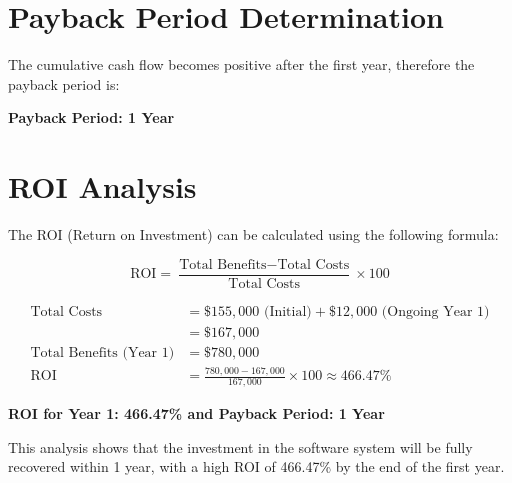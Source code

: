 \documentclass{article}
\begin{document}
\section*{Payback Period Determination}

The cumulative cash flow becomes positive after the first year, therefore the payback period is:

\textbf{Payback Period: 1 Year}

\section*{ROI Analysis}

The ROI (Return on Investment) can be calculated using the following formula:

\[
\text{ROI} = \frac{\text{Total Benefits} - \text{Total Costs}}{\text{Total Costs}} \times 100
\]

\begin{align*}
\text{Total Costs} &= \$155{,}000 \text{ (Initial)} + \$12{,}000 \text{ (Ongoing Year 1)} \\
&= \$167{,}000 \\
\text{Total Benefits (Year 1)} &= \$780{,}000 \\
\text{ROI} &= \frac{780{,}000 - 167{,}000}{167{,}000} \times 100 \approx 466.47\%
\end{align*}

\textbf{ROI for Year 1: 466.47\% and Payback Period: 1 Year}
\newline

This analysis shows that the investment in the software system will be fully recovered within 1 year, with a high ROI of 466.47\% by the end of the first year.
\end{document}
